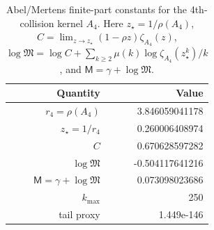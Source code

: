\begin{table}[H]
\centering
\scriptsize
\setlength{\tabcolsep}{6pt}
\caption{Abel/Mertens finite-part constants for the 4th-collision kernel $A_4$. Here $z_\star=1/\rho(A_4)$, $C=\lim_{z\to z_\star}(1-\rho z)\zeta_{A_4}(z)$, $\log\mathfrak{M}=\log C+\sum_{k\ge2}\mu(k)\log\zeta_{A_4}(z_\star^k)/k$, and $\mathsf{M}=\gamma+\log\mathfrak{M}$.}
\label{tab:collision_kernel_A4_finite_part}
\begin{tabular}{r r}
\toprule
Quantity & Value\\
\midrule
$r_4=\rho(A_4)$ & 3.846059041178\\
$z_\star=1/r_4$ & 0.260006408974\\
$C$ & 0.670628597282\\
$\log\mathfrak{M}$ & -0.504117641216\\
$\mathsf{M}=\gamma+\log\mathfrak{M}$ & 0.073098023686\\
$k_{\max}$ & 250\\
tail proxy & 1.449e-146\\
\bottomrule
\end{tabular}
\end{table}

